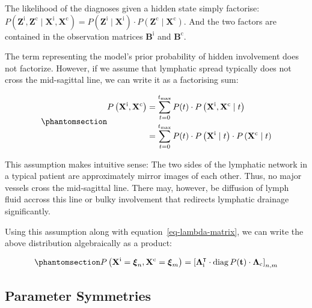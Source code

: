 \documentclass[
  sn-mathphys-num,
]{sn-jnl}
\begin{document}
The likelihood of the diagnoses given a hidden state simply factorise:
\(P \left( \mathbf{Z}^\text{i}, \mathbf{Z}^\text{c} \mid \mathbf{X}^\text{i}, \mathbf{X}^\text{c} \right) = P \left( \mathbf{Z}^\text{i} \mid \mathbf{X}^\text{i} \right) \cdot P \left( \mathbf{Z}^\text{c} \mid \mathbf{X}^\text{c} \right)\).
And the two factors are contained in the observation matrices
\(\mathbf{B}^\text{i}\) and \(\mathbf{B}^\text{c}\).

The term representing the model's prior probability of hidden
involvement does not factorize. However, if we assume that lymphatic
spread typically does not cross the mid-sagittal line, we can write it
as a factorising sum:

\begin{equation}\phantomsection\label{eq-bilateral-marginal}{
\begin{aligned}
P \left( \mathbf{X}^\text{i}, \mathbf{X}^\text{c} \right) &= \sum_{t=0}^{t_\text{max}} P(t) \cdot P \left( \mathbf{X}^\text{i}, \mathbf{X}^\text{c} \mid t \right) \\
&= \sum_{t=0}^{t_\text{max}} P(t) \cdot P \left( \mathbf{X}^\text{i} \mid t \right) \cdot P \left( \mathbf{X}^\text{c} \mid t \right)
\end{aligned}
}\end{equation}

This assumption makes intuitive sense: The two sides of the lymphatic
network in a typical patient are approximately mirror images of each
other. Thus, no major vessels cross the mid-sagittal line. There may,
however, be diffusion of lymph fluid accross this line or bulky
involvement that redirects lymphatic drainage significantly.

Using this assumption along with equation~\ref{eq-lambda-matrix}, we can
write the above distribution algebraically as a product:

\begin{equation}\phantomsection\label{eq-bilateral-marginal-algebra}{
P \left( \mathbf{X}^\text{i} = \boldsymbol{\xi}_n, \mathbf{X}^\text{c} = \boldsymbol{\xi}_m \right) = \left[ \boldsymbol{\Lambda}^\intercal_\text{i} \cdot \operatorname{diag} P(\mathbf{t}) \cdot \boldsymbol{\Lambda}_\text{c} \right]_{n,m}
}\end{equation}

\subsection{Parameter Symmetries}\label{sec-params-symmetry}
\end{document}
